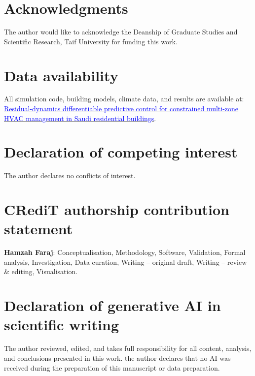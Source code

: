 \documentclass[12pt]{article}
\theoremstyle{plain}
\theoremstyle{definition}
\begin{document}
\section {Acknowledgments}
The author would like to acknowledge the Deanship of Graduate Studies and Scientific Research, Taif University for funding this work.

\section {Data availability}
All simulation code, building models, climate data, and results are available at:  \href{https://github.com/drhamzahfaraj/RD-differentiable-predictive-control-for-constrained-HVAC-management-in-Saudi-residential-buildings}{\textcolor{blue}{Residual-dynamics differentiable predictive control for constrained multi-zone HVAC management in Saudi residential buildings}}.

\section {Declaration of competing interest}
The author declares no conflicts of interest.

\section {CRediT authorship contribution statement}
\textbf{Hamzah Faraj}: Conceptualisation, Methodology, Software, Validation, Formal analysis, Investigation, Data curation, Writing -- original draft, Writing -- review \& editing, Visualisation.

\section {Declaration of generative AI in scientific writing}
The author reviewed, edited, and takes full responsibility for all content, analysis, and conclusions presented in this work.
the author declares that no AI  was received during the preparation of this manuscript or data preparation.

{\sloppy


}

\appendix
\end{document}
